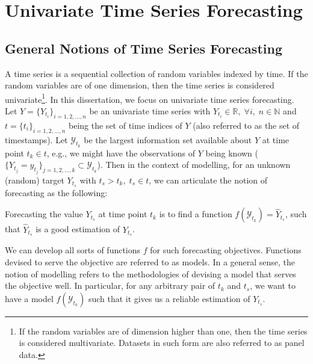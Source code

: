 \section{Univariate Time Series Forecasting}

\subsection{General Notions of Time Series Forecasting}
A time series is a sequential collection of random variables indexed by time. If the random variables are of one dimension, then the time series is considered univariate\footnote{If the random variables are of dimension higher than one, then the time series is considered multivariate. Datasets in such form are also referred to as panel data.}. In this dissertation, we focus on univariate time series forecasting. Let $Y = \{Y_{t_i} \}_{i = 1, 2, \ldots, n}$ be an univariate time series with $ Y_{t_i} \in \mathbb{R}, \; \forall i, \; n \in \mathbb{N}$ and $t = \{t_i \}_{i = 1, 2, \ldots, n}$ being the set of time indices of $Y$ (also referred to as the set of timestamps). Let $\mathcal{Y}_{t_k}$ be the largest information set available about $Y$ at time point $t_k \in t$, e.g., we might have the observations of $Y$ being known ($\{Y_{t_j} = y_{t_j}\}_{j = 1, 2, \ldots, k } \subset \mathcal{Y}_{t_k}$). Then in the context of modelling, for an unknown (random) target $Y_{t_s}$ with $t_s > t_k, \; t_s \in t$, we can articulate the notion of forecasting as the following:
\begin{displayquote}
    Forecasting the value $Y_{t_s}$ at time point $t_k$ is to find a function $f(\mathcal{Y}_{t_k}) = \widehat{Y}_{t_s}$, such that $\widehat{Y}_{t_s}$ is a good estimation of $Y_{t_s}$.
\end{displayquote}
We can develop all sorts of functions $f$ for such forecasting objectives. Functions devised to serve the objective are referred to as models. In a general sense, the notion of modelling refers to the methodologies of devising a model that serves the objective well. In particular, for any arbitrary pair of $t_k$ and $t_s$, we want to have a model $f(\mathcal{Y}_{t_k})$ such that it gives us a reliable estimation of $Y_{t_s}$.

